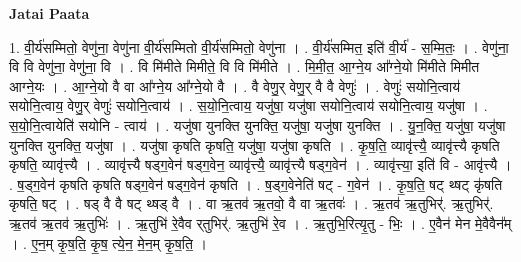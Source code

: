 \documentclass[17pt]{extarticle}
\begin{document}
\textbf{Jatai Paata} \newline

1. वी॒र्य॑सम्मितो॒ वेणु॑ना॒ वेणु॑ना वी॒र्य॑सम्मितो वी॒र्य॑सम्मितो॒ वेणु॑ना । . वी॒र्य॑सम्मित॒ इति॑ वी॒र्य॑ - स॒म्मि॒तः॒ । . वेणु॑ना॒ वि वि वेणु॑ना॒ वेणु॑ना॒ वि । . वि मि॑मीते मिमीते॒ वि वि मि॑मीते । . मि॒मी॒त॒ आ॒ग्ने॒य आ᳚ग्ने॒यो मि॑मीते मिमीत आग्ने॒यः । . आ॒ग्ने॒यो वै वा आ᳚ग्ने॒य आ᳚ग्ने॒यो वै । . वै वेणु॒र् वेणु॒र् वै वै वेणुः॑ । . वेणुः॑ सयोनि॒त्वाय॑ सयोनि॒त्वाय॒ वेणु॒र् वेणुः॑ सयोनि॒त्वाय॑ । . स॒यो॒नि॒त्वाय॒ यजु॑षा॒ यजु॑षा सयोनि॒त्वाय॑ सयोनि॒त्वाय॒ यजु॑षा । . स॒यो॒नि॒त्वायेति॑ सयोनि - त्वाय॑ । . यजु॑षा युनक्ति युनक्ति॒ यजु॑षा॒ यजु॑षा युनक्ति । . यु॒न॒क्ति॒ यजु॑षा॒ यजु॑षा युनक्ति युनक्ति॒ यजु॑षा । . यजु॑षा कृषति कृषति॒ यजु॑षा॒ यजु॑षा कृषति । . कृ॒ष॒ति॒ व्यावृ॑त्त्यै॒ व्यावृ॑त्त्यै कृषति कृषति॒ व्यावृ॑त्त्यै । . व्यावृ॑त्त्यै षड्ग॒वेन॑ षड्ग॒वेन॒ व्यावृ॑त्त्यै॒ व्यावृ॑त्त्यै षड्ग॒वेन॑ । . व्यावृ॑त्त्या॒ इति॑ वि - आवृ॑त्त्यै । . ष॒ड्ग॒वेन॑ कृषति कृषति षड्ग॒वेन॑ षड्ग॒वेन॑ कृषति । . ष॒ड्ग॒वेनेति॑ षट् - ग॒वेन॑ । . कृ॒ष॒ति॒ षट् थ्षट् कृ॑षति कृषति॒ षट् । . षड् वै वै षट् थ्षड् वै । . वा ऋ॒तव॑ ऋ॒तवो॒ वै वा ऋ॒तवः॑ । . ऋ॒तव॑ ऋ॒तुभिर्॑. ऋ॒तुभिर्॑. ऋ॒तव॑ ऋ॒तव॑ ऋ॒तुभिः॑ । . ऋ॒तुभि॑ रे॒वैव र्‌तुभिर्॑. ऋ॒तुभि॑ रे॒व । . ऋ॒तुभि॒रित्यृ॒तु - भिः॒ । . ए॒वैन॑ मेन मे॒वैवैन᳚म् । . ए॒न॒म् कृ॒ष॒ति॒ कृ॒ष॒ त्ये॒न॒ मे॒न॒म् कृ॒ष॒ति॒ । \newline
\end{document}
